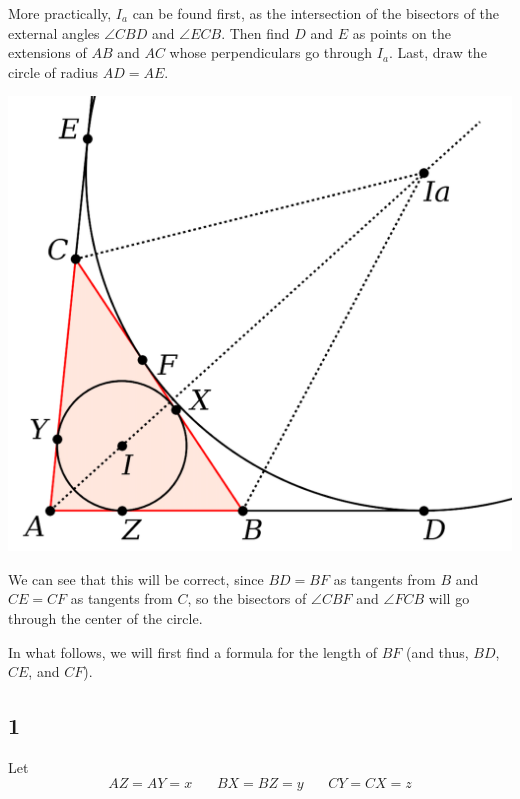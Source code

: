 \documentclass[11pt, oneside]{article}
\begin{document}
More practically, $I_a$ can be found first, as the intersection of the bisectors of the external angles $\angle CBD$ and $\angle ECB$.  Then find $D$ and $E$ as points on the extensions of $AB$ and $AC$ whose perpendiculars go through $I_a$.  Last, draw the circle of radius $AD = AE$.

\begin{center} \includegraphics [scale=0.40] {excircle_crop1.png} \end{center}

We can see that this will be correct, since $BD = BF$ as tangents from $B$ and $CE = CF$ as tangents from $C$, so the bisectors of $\angle CBF$ and $\angle FCB$ will go through the center of the circle.

In what follows, we will first find a formula for the length of $BF$ (and thus, $BD$, $CE$, and $CF$).

\newpage

\subsection*{1}

Let
\[ AZ = AY = x \ \ \ \ \ \ \ \ BX = BZ = y \ \ \ \ \ \ \ \ CY = CX = z \]
\end{document}
